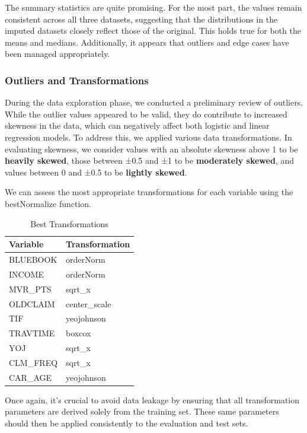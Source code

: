\documentclass[
]{article}
\begin{document}
The summary statistics are quite promising. For the most part, the
values remain consistent across all three datasets, suggesting that the
distributions in the imputed datasets closely reflect those of the
original. This holds true for both the means and medians. Additionally,
it appears that outliers and edge cases have been managed appropriately.

\subsubsection{Outliers and
Transformations}\label{outliers-and-transformations}

During the data exploration phase, we conducted a preliminary review of
outliers. While the outlier values appeared to be valid, they do
contribute to increased skewness in the data, which can negatively
affect both logistic and linear regression models. To address this, we
applied various data transformations. In evaluating skewness, we
consider values with an absolute skewness above 1 to be \textbf{heavily
skewed}, those between ±0.5 and ±1 to be \textbf{moderately skewed}, and
values between 0 and ±0.5 to be \textbf{lightly skewed}.

We can assess the most appropriate transformations for each variable
using the bestNormalize function.

\begin{table}[H]
\centering\centering
\caption{\label{tab:bestNormalize usage}Best Transformations}
\centering
\begin{tabular}[t]{l|l}
\hline
Variable & Transformation\\
\hline
BLUEBOOK & orderNorm\\
\hline
INCOME & orderNorm\\
\hline
MVR\_PTS & sqrt\_x\\
\hline
OLDCLAIM & center\_scale\\
\hline
TIF & yeojohnson\\
\hline
TRAVTIME & boxcox\\
\hline
YOJ & sqrt\_x\\
\hline
CLM\_FREQ & sqrt\_x\\
\hline
CAR\_AGE & yeojohnson\\
\hline
\end{tabular}
\end{table}

Once again, it's crucial to avoid data leakage by ensuring that all
transformation parameters are derived solely from the training set.
These same parameters should then be applied consistently to the
evaluation and test sets.
\end{document}
